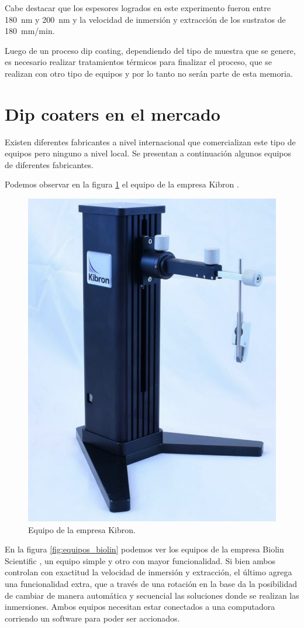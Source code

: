 

Cabe destacar que los espesores logrados en este experimento fueron entre \SI{180}{nm} y \SI{200}{nm} y la velocidad de inmersión y extracción de los sustratos de \SI{180}{mm/min}.

Luego de un proceso dip coating, dependiendo del tipo de muestra que se genere, es necesario realizar tratamientos térmicos para finalizar el proceso, que se realizan con otro tipo de equipos y por lo tanto no serán parte de esta memoria.
 
\label{sec:dip coating}

\section{Dip coaters en el mercado}
\label{sec:mercado}
Existen diferentes fabricantes a nivel internacional que comercializan este tipo de equipos pero ninguno a nivel local. Se presentan a continuación algunos equipos de diferentes fabricantes. 

Podemos observar en la figura \ref{fig:dip_kibron} el equipo de la empresa Kibron \citep{2_web_kibron}.

\begin{figure}[htbp]
	\centering
	\includegraphics[width=.25\textwidth]{./Figures/kibron.pdf}
	\caption{Equipo de la empresa Kibron.}
	\label{fig:dip_kibron}
\end{figure}

En la figura \ref{fig:equipos_biolin} podemos ver los equipos de la empresa Biolin Scientific  \citep{1_web_biolin}, un equipo simple y otro con mayor funcionalidad. Si bien ambos controlan con exactitud la velocidad de inmersión y extracción, el último agrega una funcionalidad extra, que a través de una rotación en la base da la posibilidad de cambiar de manera automática y secuencial las soluciones donde se realizan las inmersiones. Ambos equipos necesitan estar conectados a una computadora corriendo un software para poder ser accionados.


